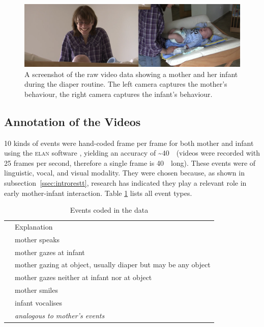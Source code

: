 \begin{figure}
	\includegraphics[width=\textwidth]{../aux/img/video_vp_08_compact.png}
	\caption[Screenshot of the raw video data.]{A screenshot of the raw video data showing a mother and her infant during the diaper routine. The left camera captures the mother's behaviour, the right camera captures the infant's behaviour.}
	\label{fig:rawvid}
\end{figure}

\subsection{Annotation of the Videos}
\label{ssec:fpmmetann}
10 kinds of events were hand-coded frame per frame for both mother and infant using the \textsc{elan} software \citep{wittenburg_elan_2006}, yielding an accuracy of \textasciitilde40~\ms\ (videos were recorded with 25 frames per second, therefore a single frame is 40~\ms\ long).
These events were of linguistic, vocal, and visual modality.  %
They were chosen because, as shown in subsection~\ref{ssec:introrestt}, research has indicated they play a relevant role in early mother-infant interaction.
Table \ref{tab:events} lists all event types.

\begin{table}
	\centering
	\begin{tabularx}{\textwidth}{>{\ttfamily}lX}  %
		\toprule
		{\rmfamily Event}	& Explanation \\
		\cmidrule(lr){1-1} \cmidrule(lr){2-2}
		\mosp	& mother speaks \\
		\mogain	& mother gazes at infant \\
		\mogaob	& mother gazing at object, usually diaper but may be any object \\
		\mogaaw	& mother gazes neither at infant nor at object \\
		\mosm	& mother smiles \\
		\midrule
		\invo	& infant vocalises \\
		\cmidrule(lr){2-2}
		\ingamo	& \multirow{4}{*}{\textit{analogous to mother's events}} \\
		\ingaob \\
		\ingaaw \\
		\insm \\
		\bottomrule
	\end{tabularx}
	\caption{Events coded in the data}
	\label{tab:events}
\end{table}

